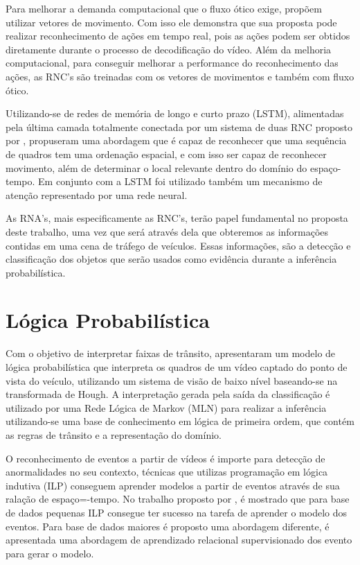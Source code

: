 \documentclass[
	12pt,				%
    oneside,			%
	a4paper,			%
	english,			%
	french,				%
	spanish,			%
	brazil,				%
	]{abntex2}
\begin{document}
Para melhorar a demanda computacional que o fluxo ótico exige,  propõem utilizar vetores de movimento. Com isso ele demonstra que sua proposta pode realizar reconhecimento de ações em tempo real, pois as ações podem ser obtidos diretamente durante o processo de decodificação do vídeo. Além da melhoria computacional, para conseguir melhorar a performance do reconhecimento das ações, as RNC’s são treinadas com os vetores de movimentos e também com fluxo ótico.

Utilizando-se de redes de memória de longo e curto prazo (LSTM), alimentadas pela última camada totalmente conectada por um sistema de duas RNC proposto por ,  propuseram uma abordagem que é capaz de reconhecer que uma sequência de quadros tem uma ordenação espacial, e com isso ser capaz de reconhecer movimento, além de determinar o local relevante dentro do domínio do espaço-tempo. Em conjunto com a LSTM foi utilizado também um mecanismo de atenção representado por uma rede neural.

As RNA's, mais especificamente as RNC's, terão papel fundamental no proposta deste trabalho, uma vez que será através dela que obteremos as informações contidas em uma cena de tráfego de veículos. Essas informações, são a detecção e classificação dos objetos que serão usados como evidência durante a inferência probabilística.

\section {Lógica Probabilística}

Com o objetivo de interpretar faixas de trânsito,  apresentaram um modelo de lógica probabilística que interpreta os quadros de um vídeo captado do ponto de vista do veículo, utilizando um sistema de visão de baixo nível baseando-se na transformada de Hough. A interpretação gerada pela saída da classificação é utilizado por uma Rede Lógica de Markov (MLN) para realizar a inferência utilizando-se uma base de conhecimento em lógica de primeira ordem, que contém as regras de trânsito e a representação do domínio. 

O reconhecimento de eventos a partir de vídeos é importe para detecção de anormalidades no seu contexto, técnicas que utilizas programação em lógica indutiva (ILP) conseguem aprender modelos a partir de eventos através de sua ralação de espaço=-tempo.  No trabalho proposto por , é mostrado que para base de dados pequenas ILP consegue ter sucesso na tarefa de aprender o modelo dos eventos. Para base de dados maiores é proposto uma abordagem diferente, é apresentada uma abordagem de aprendizado relacional supervisionado dos evento para gerar o modelo.
\end{document}
